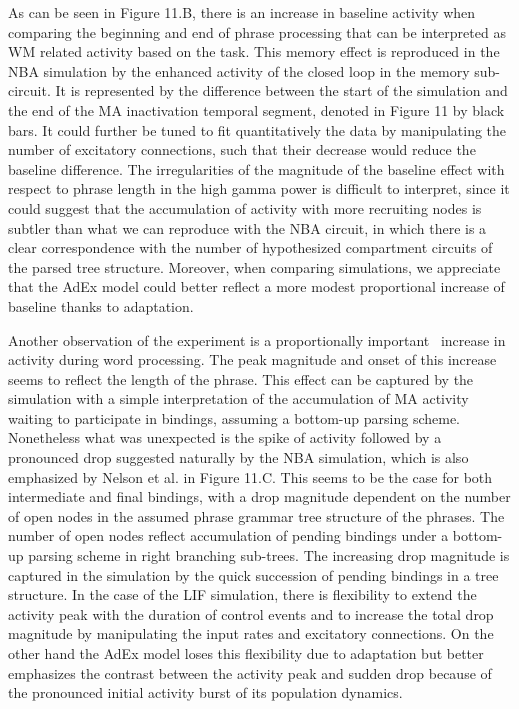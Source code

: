 \documentclass[10pt]{article}
\begin{document}
As can be seen in Figure 11.B, there is an increase in baseline activity when comparing the beginning and end of phrase processing that can be interpreted as WM related activity based on the task.
This memory effect is reproduced in the NBA simulation by the enhanced activity of the closed loop in the memory sub-circuit.
It is represented by the difference between the start of the simulation and the end of the MA inactivation temporal segment, denoted in Figure 11 by black bars.
It could further be tuned to fit quantitatively the data by manipulating the number of excitatory connections, such that their decrease would reduce the baseline difference.
The irregularities of the magnitude of the baseline effect with respect to phrase length in the high gamma power is difficult to interpret, since it could suggest that the accumulation of activity with more recruiting nodes is subtler than what we can reproduce with the NBA circuit, in which there is a clear correspondence with the number of hypothesized compartment circuits of the parsed tree structure.
Moreover, when comparing simulations, we appreciate that the AdEx model could better reflect a more modest proportional increase of baseline thanks to adaptation.~

Another observation of the experiment is a proportionally important ~increase in activity during word processing.
The peak magnitude and onset of this increase seems to reflect the length of the phrase.
This effect can be captured by the simulation with a simple interpretation of the accumulation of MA activity waiting to participate in bindings, assuming a bottom-up parsing scheme.
Nonetheless what was unexpected is the spike of activity followed by a pronounced drop suggested naturally by the NBA simulation, which is also emphasized by Nelson et al. in Figure 11.C.
This seems to be the case for both intermediate and final bindings, with a drop magnitude dependent on the number of open nodes in the assumed phrase grammar tree structure of the phrases.
The number of open nodes reflect accumulation of pending bindings under a bottom-up parsing scheme in right branching sub-trees.
The increasing drop magnitude is captured in the simulation by the quick succession of pending bindings in a tree structure.
In the case of the LIF simulation, there is flexibility to extend the activity peak with the duration of control events and to increase the total drop magnitude by manipulating the input rates and excitatory connections.
On the other hand the AdEx model loses this flexibility due to adaptation but better emphasizes the contrast between the activity peak and sudden drop because of the pronounced initial activity burst of its population dynamics.
\end{document}
